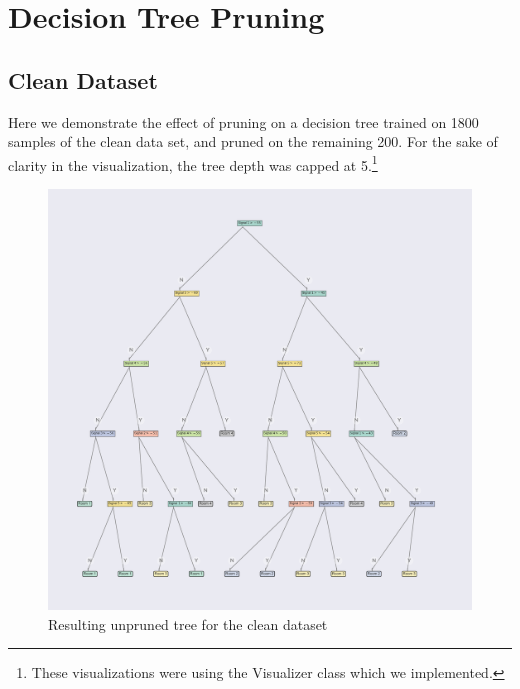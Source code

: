 \section{Decision Tree Pruning}

\label{app:tree_figure}
\subsection{Clean Dataset}
Here we demonstrate the effect of pruning on a decision tree trained on 1800 samples of the clean data set, and pruned on the remaining 200. For the sake of clarity in the visualization, the tree depth was capped at 5.\footnote{These visualizations were using the Visualizer class which we implemented.}
\begin{figure}[H]
    \centering
    \includegraphics[width=\textwidth]{figures/clean_unpruned.pdf}
    \caption[Unpruned Tree for the Clean Dataset]{Resulting unpruned tree for the clean dataset}
    \label{fig:pruning_example_clean_unpruned}
\end{figure}

\newpage

